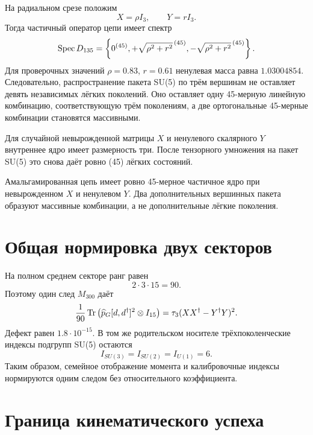 На радиальном срезе положим
\begin{equation}
 X=\rho I_3,
 \qquad Y=rI_3.
\end{equation}
Тогда частичный оператор цепи имеет спектр
\begin{equation}
 \operatorname{Spec} D_{135}
 =\left\{
 0^{(45)},
 +\sqrt{\rho^2+r^2}^{\,(45)},
 -\sqrt{\rho^2+r^2}^{\,(45)}
 \right\}.
 \label{eq:v5-m300-chain-spectrum}
\end{equation}
Для проверочных значений \(\rho=0.83\), \(r=0.61\) ненулевая масса равна
\(1.03004854\). Следовательно, распространение пакета SU(5) по трём
вершинам не оставляет девять независимых лёгких поколений. Оно оставляет
одну 45-мерную линейную комбинацию, соответствующую трём поколениям, а две
ортогональные 45-мерные комбинации становятся массивными.

Для случайной невырожденной матрицы \(X\) и ненулевого скалярного \(Y\)
внутреннее ядро имеет размерность три. После тензорного умножения на пакет
SU(5) это снова даёт ровно (45) лёгких состояний.

\begin{theorem}
Амальгамированная цепь имеет ровно 45-мерное частичное ядро при
невырожденном \(X\) и ненулевом \(Y\). Два дополнительных вершинных пакета
образуют массивные комбинации, а не дополнительные лёгкие поколения.
\end{theorem}

\section{Общая нормировка двух секторов}

На полном среднем секторе ранг равен
\begin{equation}
 2\cdot3\cdot15=90.
\end{equation}
Поэтому один след \(M_{300}\) даёт
\begin{equation}
 \frac1{90}\operatorname{Tr}\left(
 \widehat p_G[d,d^\dagger]^2\otimes I_{15}
 \right)
 =\tau_3(XX^\dagger-Y^\dagger Y)^2.
\end{equation}
Дефект равен \(1.8\cdot10^{-15}\). В том же родительском носителе
трёхпоколенческие индексы подгрупп SU(5) остаются
\begin{equation}
 I_{SU(3)}=I_{SU(2)}=I_{U(1)}=6.
\end{equation}
Таким образом, семейное отображение момента и калибровочные индексы
нормируются одним следом без относительного коэффициента.

\section{Граница кинематического успеха}


